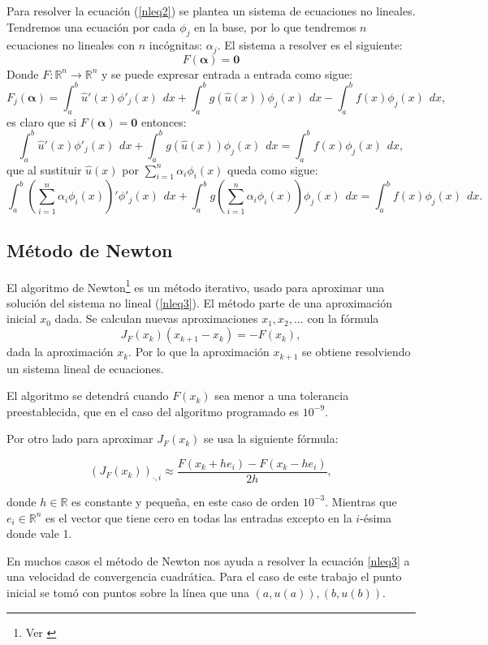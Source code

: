 \documentclass[12pt,spanish,oneside]{book}
\theoremstyle{plain}
\numberwithin{equation}{chapter}
\theoremstyle{definition}
\theoremstyle{remark}
\newcommand{\re}{\mathbb{R}}
\newcommand{\dx}{\hspace{5pt} dx}
\begin{document}
Para resolver la ecuación (\ref{nleq2}) se plantea un sistema de ecuaciones no lineales. Tendremos una ecuación por cada $\phi_j$ en la base, por lo que tendremos $n$ ecuaciones no lineales con $n$ incógnitas: $\alpha_j$. El sistema a resolver es el siguiente:
\begin{equation}
F(\boldsymbol\alpha)=\textbf{0}\label{nleq3}
\end{equation} 
Donde $F:\re^n\rightarrow\re^n$ y se puede expresar entrada a entrada como sigue: 
\[F_j(\boldsymbol\alpha)=\int_a^b\hat{u}'(x)\phi'_j(x)\dx+\int_a^b g(\hat{u}(x)) \phi_j(x)\dx-\int_a^b f(x) \phi_j(x)\dx,\]
es claro que si $F(\boldsymbol\alpha)=\boldsymbol 0$ entonces:
\[\int_a^b\hat{u}'(x)\phi'_j(x)\dx+\int_a^b g(\hat{u}(x)) \phi_j(x)\dx=\int_a^b f(x) \phi_j(x)\dx,\]
que al sustituir $\hat{u}(x)$ por $\sum_{i=1}^n\alpha_i\phi_i(x)$ queda como sigue: 
\[\int_a^b\left(\sum_{i=1}^n\alpha_i\phi_i(x)\right)'\phi'_j(x)\dx+\int_a^b g\left(\sum_{i=1}^n\alpha_i\phi_i(x)\right) \phi_j(x)\dx=\int_a^b f(x) \phi_j(x)\dx.\]


\subsection{Método de Newton} 

El algoritmo de Newton\footnote{ Ver \cite{Nocedal} } es un método iterativo, usado para aproximar una solución del sistema no lineal (\ref{nleq3}). El método parte de una aproximación inicial $x_0$ dada. Se calculan nuevas aproximaciones $x_1,x_2,...$ con la fórmula
\[J_F(x_{k})(x_{k+1}-x_k)=-F(x_k),\]
dada la aproximación $x_k$. Por lo que la aproximación $x_{k+1}$ se obtiene resolviendo un sistema lineal de ecuaciones. 

El algoritmo se detendrá cuando $F(x_k)$ sea menor a una tolerancia preestablecida, que en el caso del algoritmo programado es $10^{-9}$. 

Por otro lado para aproximar $J_F(x_k)$ se usa la siguiente fórmula:

\[(J_F(x_k))_{\cdot,i}\approx\frac{F(x_k+he_i)-F(x_k-he_i)}{2h}, \]

donde $h\in \re$ es constante y pequeña, en este caso de orden $10^{-3}$. Mientras que $e_i\in \re^n$ es el vector que tiene cero en todas las entradas excepto en la $i$-ésima donde vale 1.

En muchos casos el método de Newton nos ayuda a resolver la ecuación \ref{nleq3} a una velocidad de convergencia cuadrática. Para el caso de este trabajo el punto inicial se tomó con puntos sobre la línea que una $(a,u(a)),(b,u(b))$.
\end{document}
